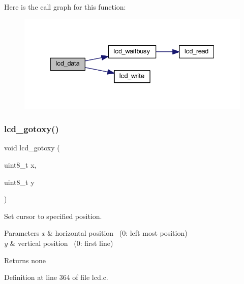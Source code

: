 Here is the call graph for this function\+:\nopagebreak
\begin{figure}[H]
\begin{center}
\leavevmode
\includegraphics[width=331pt]{group__pfleury__lcd_gad0729d2cba627825a089ca1fff12ba29_cgraph}
\end{center}
\end{figure}
\mbox{\label{group__pfleury__lcd_gadbf47a5efdf02367ded1ebf8f9edb5fe}} 
\subsubsection{\texorpdfstring{lcd\_gotoxy()}{lcd\_gotoxy()}}
{\footnotesize\ttfamily void lcd\+\_\+gotoxy (\begin{DoxyParamCaption}\item[{uint8\+\_\+t}]{x,  }\item[{uint8\+\_\+t}]{y }\end{DoxyParamCaption})}



Set cursor to specified position. 


\begin{DoxyParams}{Parameters}
{\em x} & horizontal position~\newline
 (0\+: left most position) \\
\hline
{\em y} & vertical position~\newline
 (0\+: first line) \\
\hline
\end{DoxyParams}
\begin{DoxyReturn}{Returns}
none 
\end{DoxyReturn}


Definition at line 364 of file lcd.\+c.

